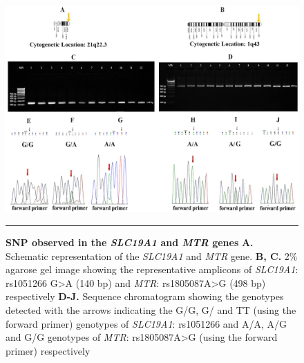 \begin{refsection}
\begin{figure}
\centering
\includegraphics[scale=0.8,keepaspectratio]{Figures/Figure6_2edited.pdf}
\rule{35em}{0.5pt}
\caption[SNP observed in the \textit{SLC19A1} and \textit{MTR} genes]{\textbf{SNP observed in the \textit{SLC19A1} and \textit{MTR} genes}
\textbf{A.} Schematic representation of the \textit{SLC19A1} and \textit{MTR} gene. \textbf{B, C.} 2\% agarose gel image showing the representative amplicons of \textit{SLC19A1}:  rs1051266 G>A (140 bp) and \textit{MTR}: rs1805087A>G (498 bp) respectively \textbf{D-J.} Sequence chromatogram showing the genotypes detected with the arrows indicating the G/G, G/ and TT (using the forward primer) genotypes of \textit{SLC19A1}:  rs1051266  and A/A, A/G and G/G genotypes of \textit{MTR}: rs1805087A>G (using the forward primer) respectively}
\label{fig:6_2}
\end{figure}


\end{refsection}
